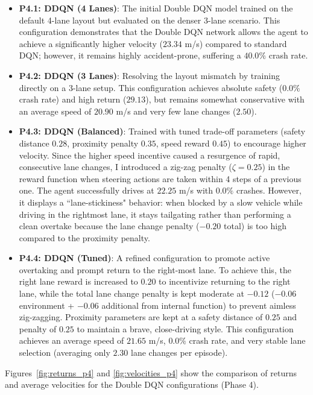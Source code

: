 \documentclass{article}
\begin{document}
\begin{itemize}
    \item \textbf{P4.1: DDQN (4 Lanes)}: The initial Double DQN model trained on the default 4-lane layout but evaluated on the denser 3-lane scenario. This configuration demonstrates that the Double DQN network allows the agent to achieve a significantly higher velocity ($23.34$ m/s) compared to standard DQN; however, it remains highly accident-prone, suffering a $40.0\%$ crash rate.
    \item \textbf{P4.2: DDQN (3 Lanes)}: Resolving the layout mismatch by training directly on a 3-lane setup. This configuration achieves absolute safety ($0.0\%$ crash rate) and high return ($29.13$), but remains somewhat conservative with an average speed of $20.90$ m/s and very few lane changes ($2.50$).
    \item \textbf{P4.3: DDQN (Balanced)}: Trained with tuned trade-off parameters (safety distance $0.28$, proximity penalty $0.35$, speed reward $0.45$) to encourage higher velocity. Since the higher speed incentive caused a resurgence of rapid, consecutive lane changes, I introduced a zig-zag penalty ($\zeta = 0.25$) in the reward function when steering actions are taken within 4 steps of a previous one. The agent successfully drives at $22.25$ m/s with $0.0\%$ crashes. However, it displays a “lane-stickiness" behavior: when blocked by a slow vehicle while driving in the rightmost lane, it stays tailgating rather than performing a clean overtake because the lane change penalty ($-0.20$ total) is too high compared to the proximity penalty.
    \item \textbf{P4.4: DDQN (Tuned)}: A refined configuration to promote active overtaking and prompt return to the right-most lane. To achieve this, the right lane reward is increased to $0.20$ to incentivize returning to the right lane, while the total lane change penalty is kept moderate at $-0.12$ ($-0.06$ environment + $-0.06$ additional from internal function) to prevent aimless zig-zagging. Proximity parameters are kept at a safety distance of $0.25$ and penalty of $0.25$ to maintain a brave, close-driving style. This configuration achieves an average speed of $21.65$ m/s, $0.0\%$ crash rate, and very stable lane selection (averaging only $2.30$ lane changes per episode).
\end{itemize}

Figures~\ref{fig:returns_p4} and \ref{fig:velocities_p4} show the comparison of returns and average velocities for the Double DQN configurations (Phase 4).
\end{document}
